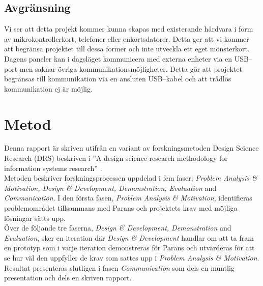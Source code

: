 \documentclass{article}
\begin{document}

        \subsection{Avgränsning} %
        \label{sub:avgransning}
            Vi ser att detta projekt kommer kunna skapas med existerande hårdvara i form av mikrokontrollerkort, telefoner eller enkortsdatorer. Detta ger att vi kommer att begränsa projektet till dessa former och inte utveckla ett eget mönsterkort.\\

            \noindent Dagens paneler kan i dagsläget kommunicera med externa enheter via en USB--port men saknar övriga kommunikationsmöjligheter. Detta gör att projektet begränsas till kommunikation via en ansluten USB--kabel och att trådlös kommunikation ej är möjlig.

    \section{Metod} %
    \label{sec:metod}

        Denna rapport är skriven utifrån en variant av forskningsmetoden Design Science Research (DRS) beskriven i 
        ''A design science research methodology for information systems research'' \cite{method}. \\

        \noindent Metoden beskriver forskningsprocessen uppdelad i fem faser; 
        \textit{Problem Analysis \& Motivation, Design \& Development, Demonstration, Evaluation} and \textit{Communication}. 
        I den första fasen, \textit{Problem Analysis \& Motivation}, identifieras problemområdet tillsammans med Parans och projektets krav med möjliga lösningar sätts upp.\\

        \noindent Över de följande tre faserna, \textit{Design \& Development, Demonstration} and \textit{Evaluation}, sker en iteration där \textit{Design \& Development} handlar om att ta fram en prototyp som i varje iteration demonstreras för Parans och utvärderas för att se hur väl den uppfyller de krav som sattes upp i \textit{Problem Analysis \& Motivation}.\\
        Resultat presenteras slutligen i fasen \textit{Communication} som dels en muntlig presentation och dels en skriven rapport. \\
\end{document}
